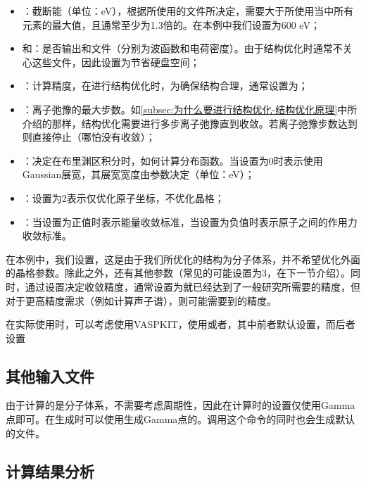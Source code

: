 \begin{itemize}
    \item {}：截断能（单位：eV），根据所使用的文件所决定，需要大于所使用当中所有元素的最大值，且通常至少为1.3倍的。在本例中我们设置为600 eV；
    \item {}和：是否输出和文件（分别为波函数和电荷密度）。由于结构优化时通常不关心这些文件，因此设置为节省硬盘空间；
    \item {}：计算精度，在进行结构优化时，为确保结构合理，通常设置为；
    \item {}：离子弛豫的最大步数。如\ref{subsec:为什么要进行结构优化-结构优化原理}中所介绍的那样，结构优化需要进行多步离子弛豫直到收敛。若离子弛豫步数达到则直接停止（哪怕没有收敛）；
    \item {}：决定在布里渊区积分时，如何计算分布函数。当设置为0时表示使用Gaussian展宽，其展宽宽度由参数决定（单位：eV）；
    \item {}：设置为2表示仅优化原子坐标，不优化晶格；
    \item {}：当设置为正值时表示能量收敛标准，当设置为负值时表示原子之间的作用力收敛标准。
\end{itemize}

在本例中，我们设置，这是由于我们所优化的结构为分子体系，并不希望优化外面的晶格参数。除此之外，还有其他参数（常见的可能设置为3，在下一节介绍）。同时，通过设置决定收敛精度，通常设置为就已经达到了一般研究所需要的精度，但对于更高精度需求（例如计算声子谱），则可能需要到的精度。

在实际使用时，可以考虑使用VASPKIT，使用或者，其中前者默认设置，而后者设置

\subsection{其他输入文件}\label{subsec:对坐标进行优化ISIF=2-其他输入文件}

由于计算的是分子体系，不需要考虑周期性，因此在计算时的设置仅使用Gamma点即可。在生成时可以使用生成Gamma点的。调用这个命令的同时也会生成默认的文件。

\subsection{计算结果分析}\label{subsec:对坐标进行优化ISIF=2-计算结果分析}

